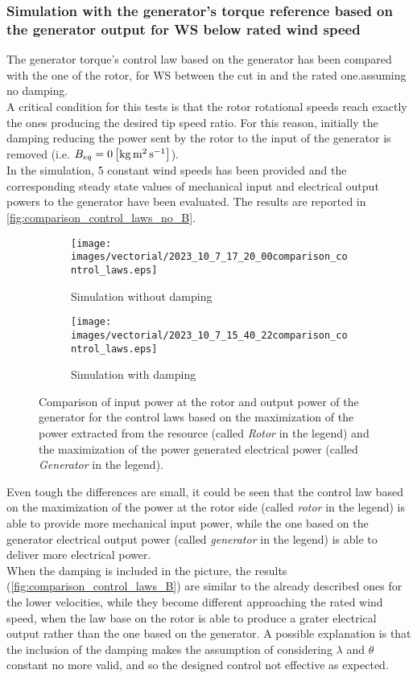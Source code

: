\subsubsection{Simulation with the generator's torque reference based on the generator output for WS below rated wind speed}
The generator torque's control law based on the generator has been compared with the one of the rotor, for WS between the cut in and the rated one.assuming no damping. \\
A critical condition for this tests is that the rotor rotational speeds reach exactly the ones producing the desired tip speed ratio. For this reason, initially the damping reducing the power sent by the rotor to the input of the generator is removed (i.e. $B_{eq}=0 \left[\si{\kilo\gram\square\meter\per\second}\right]$). \\
In the simulation, 5 constant wind speeds has been provided and the corresponding steady state values of mechanical input and electrical output powers to the generator have been evaluated. The results are reported in \autoref{fig:comparison_control_laws_no_B}.
\begin{figure}[htb]
  \centering
  \begin{subfigure}{\columnwidth}
    \texttt{[image: images/vectorial/2023\_10\_7\_17\_20\_00comparison\_control\_laws.eps]}
    \caption{Simulation without damping}
    \label{fig:comparison_control_laws_no_B}
  \end{subfigure}
  \begin{subfigure}{\columnwidth}
    \texttt{[image: images/vectorial/2023\_10\_7\_15\_40\_22comparison\_control\_laws.eps]}
    \caption{Simulation with damping}
    \label{fig:comparison_control_laws_B}
  \end{subfigure}
  \caption{Comparison of input power at the rotor and output power of the generator for the control laws based on the maximization of the power extracted from the resource (called \textit{Rotor} in the legend) and the maximization of the power generated electrical power (called \textit{Generator} in the legend).}
  \label{fig:comparison_control_laws}
\end{figure}

Even tough the differences are small, it could be seen that the control law based on the maximization of the power at the rotor side (called \textit{rotor} in the legend) is able to provide more mechanical input power, while the one based on the generator electrical output power (called \textit{generator} in the legend) is able to deliver more electrical power. \\
When the damping is included in the picture, the results (\autoref{fig:comparison_control_laws_B}) are similar to the already described ones for the lower velocities, while they become different approaching the rated wind speed, when the law base on the rotor is able to produce a grater electrical output rather than the one based on the generator. A possible explanation is that the inclusion of the damping makes the assumption of considering $\lambda$ and $\theta$ constant no more valid, and so the designed control not effective as expected. 

